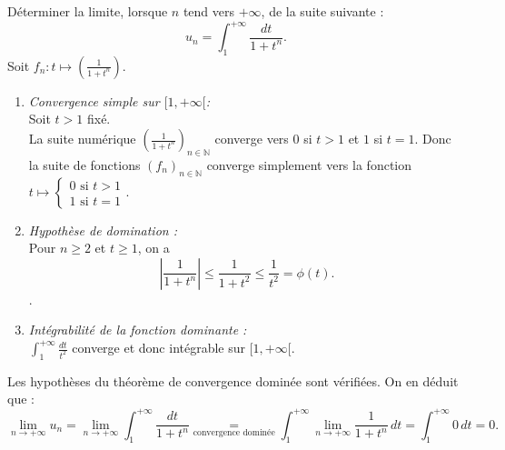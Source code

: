 \documentclass{book}
\begin{document}
\begin{Exemple}
Déterminer la limite, lorsque $n$ tend vers $+\infty$, de la  suite suivante :
$$u_n=\int_1^{+\infty}\frac{dt}{1+t^n}.$$
Soit $f_n:t\mapsto(\frac{1}{1+t^n})$.
\begin{enumerate}
\item \textit{Convergence simple sur $[1,+\infty[$:}\\ 
Soit $t>1$ fixé.\\
La suite numérique $(\frac{1}{1+t^n})_{n\in\mathbb{N}}$ converge vers 0 si $t>1$ et $1$ si $t=1$. Donc la suite de fonctions $(f_n)_{n\in\mathbb{N}}$ converge simplement vers la fonction  $t\mapsto \begin{cases} 0\text{ si } t>1 \\1\text{ si }t=1 \end{cases}$.
\item \textit{Hypothèse de domination :}\\ 
Pour $n\geq 2$ et $t\geq  1$, on a
$$\left|\frac{1}{1+t^n}\right| \leq \frac{1}{1+t^2}\leq \frac{1}{t^2}=\phi(t).$$.
\item \textit{Intégrabilité de la fonction dominante :}\\
$\int_1^{+\infty}\frac{dt}{t^2}$ converge et donc intégrable sur $[1,+\infty[$.
\end{enumerate}
Les hypothèses du théorème de convergence dominée sont vérifiées. On en déduit que :
$$\lim_{n\to +\infty}u_n=\lim_{n\to +\infty} \int_1^{+\infty}\frac{dt}{1+t^n} \underset{\text{convergence dominée}}{=}\int_1^{+\infty}\lim_{n\to +\infty} \frac{1}{1+t^n}\,dt= \int_1^{+\infty} 0\, dt=0.$$
\end{Exemple}
\end{document}

